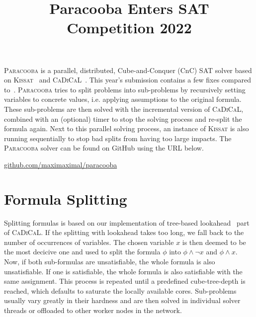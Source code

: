 \documentclass[conference]{IEEEtran}
\newcommand{\paracooba}{\textsc{Paracooba}}
\newcommand{\kissat}{\textsc{Kissat}}
\newcommand{\cadical}{\textsc{CaDiCaL}}
\begin{document}
\title{Paracooba Enters SAT Competition 2022}

\author{
}

\maketitle

\paracooba{} is a parallel, distributed, Cube-and-Conquer (CnC) SAT solver based
on \kissat{}~\cite{kissatsat2020} and \cadical~\cite{cadical}. This year's
submission contains a few fixes compared to~\cite{satcomp2021}. \paracooba{}
tries to split problems into sub-problems by recursively setting variables to
concrete values, i.e. applying assumptions to the original formula. These
sub-problems are then solved with the incremental version of \cadical{},
combined with an (optional) timer to stop the solving process and re-split the
formula again. Next to this parallel solving process, an instance of \kissat{}
is also running sequentially to stop bad splits from having too large
impacts. The \paracooba{} solver can be found on GitHub using the URL below.

\begin{center}
\href{https://github.com/maximaximal/paracooba}{github.com/maximaximal/paracooba}
\end{center}

\section{Formula Splitting}

Splitting formulas is based on our implementation of tree-based lookahead~\cite{treelook} part of
\cadical{}. If the splitting with lookahead takes too long, we fall back to the number of
occurrences of variables. The chosen variable $x$ is then deemed to be the most decicive one and
used to split the formula $\phi$ into $\phi \wedge \neg x$ and $\phi \wedge x$. Now, if both
sub-formulas are unsatisfiable, the whole formula is also unsatisfiable. If one is satisfiable, the
whole formula is also satisfiable with the same assignment. This process is repeated until a
predefined cube-tree-depth is reached, which defaults to saturate the locally
available cores.
Sub-problems usually vary greatly in their hardness and are then solved in individual
solver threads or offloaded to other worker nodes in the network.
\end{document}
